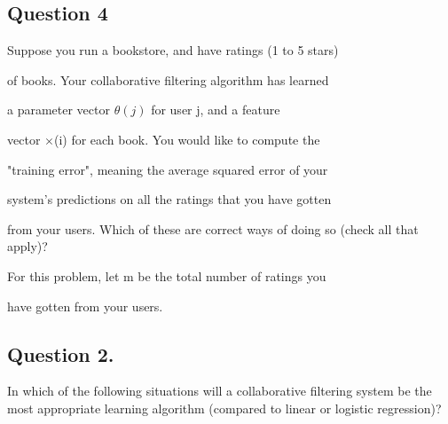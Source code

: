 \documentclass[11pt]{article} %
\begin{document}

\subsection*{Question 4 }  
Suppose you run a bookstore, and have ratings (1 to 5 stars)

of books. Your collaborative filtering algorithm has learned

a parameter vector $\theta(j)$ for user j, and a feature

vector $ \times $(i) for each book. You would like to compute the

"training error", meaning the average squared error of your

system's predictions on all the ratings that you have gotten

from your users. Which of these are correct ways of doing so (check all that apply)?

For this problem, let m be the total number of ratings you

have gotten from your users. 
%
%
%
%
%
%


\subsection*{Question 2. } 

In which of the following situations will a collaborative filtering system be the most appropriate learning algorithm (compared to linear or logistic regression)?
\end{document}
